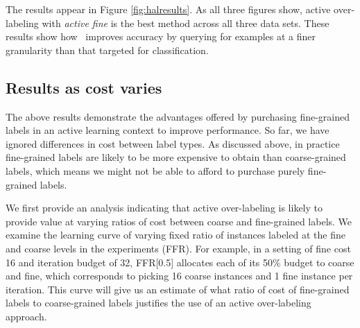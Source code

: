 The results appear in Figure \ref{fig:halresults}.  As all three figures show, active over-labeling with
{\em active fine} is the best method across all three data sets.  These results show
how \sys\ improves accuracy by querying for examples at a finer granularity than 
that targeted for classification.

\subsection{Results as cost varies}
\label{sec:cost-sens}

The above results demonstrate the advantages offered by purchasing
fine-grained labels in an active learning context to improve performance.
So far, we have ignored differences in cost
between label types.  As discussed above, in practice fine-grained labels are likely to be
more expensive to obtain than coarse-grained labels, which means we might not be able to afford to
purchase purely fine-grained labels.

We first provide an analysis indicating that active over-labeling
is likely to provide value at varying ratios of cost between coarse and
fine-grained labels. We examine the learning curve of varying fixed ratio of
instances labeled at the fine and coarse levels in the experiments (FFR). For example,
in a setting of fine cost 16 and iteration budget of 32, FFR[0.5] allocates each of its 50\%
budget to coarse and fine, which corresponds to picking 16 coarse instances and 1 fine instance per iteration.
This curve will give us an estimate of what ratio of cost of fine-grained labels to coarse-grained
labels justifies the use of an active over-labeling approach.

